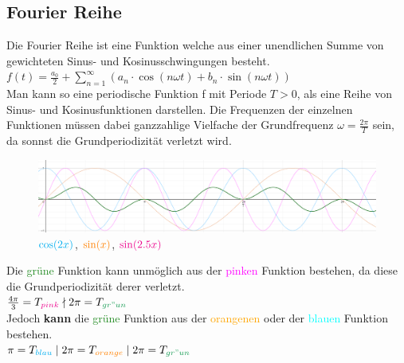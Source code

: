 \documentclass[12pt,a4paper]{article}
\newcommand{\green}[1]{\textcolor{ForestGreen} {#1}}
\newcommand{\magenta}[1]{\textcolor{magenta} {#1}}
\newcommand{\cyan}[1]{\textcolor{cyan} {#1}}
\newcommand{\orange}[1]{\textcolor{orange} {#1}}
\newcommand{\nl}{\\[0.1cm]}
\begin{document}
\subsection{Fourier Reihe}
Die Fourier Reihe ist eine Funktion welche aus einer unendlichen Summe von gewichteten Sinus- und Kosinusschwingungen besteht. $\displaystyle f(t) = \frac{a_0}{2} + \sum_{n=1}^\infty (a_n \cdot \cos (n\omega t) + b_n\cdot \sin(n\omega t))$\nl
Man kann so eine periodische Funktion f mit Periode $T>0$, als eine Reihe von Sinus- und Kosinusfunktionen darstellen. Die Frequenzen der einzelnen Funktionen müssen dabei ganzzahlige Vielfache der Grundfrequenz $\omega = \frac{2\pi}{T}$ sein, da sonnst die Grundperiodizität verletzt wird.
\begin{figure}[H]
\includegraphics[width=\textwidth]{./resources/grundperiode.png}
\caption{$\cyan{\cos(2x)}$, $\orange{\sin(x)}$, $\magenta{\sin(2.5x)}$}
\end{figure}
Die \green{grüne} Funktion kann unmöglich aus der \magenta{pinken} Funktion bestehen, da diese die Grundperiodizität derer verletzt.\\
$\frac{4\pi}{3} = T_{\magenta{pink}} \nmid 2\pi = T_{\green{gr"un}}$\nl
Jedoch \textbf{kann} die \green{grüne} Funktion aus der \orange{orangenen} oder der \cyan{blauen} Funktion bestehen.\\$\pi = T_{\cyan{blau}} \mid 2\pi = T_{\orange{orange}} \mid 2\pi = T_{\green{gr"un}}$\nl
\end{document}
